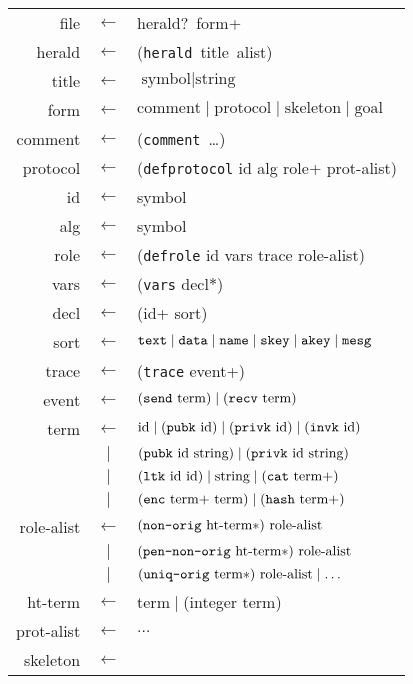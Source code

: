 \begin{table}
\newcommand{\sym}[1]{\textup{\texttt{#1}}}
\begin{center}\scshape
\begin{tabular}{rcl}
file&$\leftarrow$&herald?~form+
\\herald&$\leftarrow$&
(\sym{herald}~title~alist)
\\title&$\leftarrow$&$\mbox{symbol}\mid\mbox{string}$
\\form&$\leftarrow$&
$\mbox{comment}\mid\mbox{protocol}\mid\mbox{skeleton}\mid\mbox{goal}$
\\ comment&$\leftarrow$&
(\sym{comment}~\ldots)
\\ protocol&$\leftarrow$&
(\sym{defprotocol} id alg role+ prot-alist)
\\ id&$\leftarrow$&symbol
\\ alg&$\leftarrow$&symbol
\\ role&$\leftarrow$&
(\sym{defrole} id vars trace role-alist)
\\ vars&$\leftarrow$&
(\sym{vars} decl$\ast$)
\\ decl&$\leftarrow$&
(id+ sort)
\\ sort&$\leftarrow$&
$\sym{text} \mid \sym{data} \mid \sym{name} \mid \sym{skey}
\mid \sym{akey}\mid\sym{mesg}$
\\ trace&$\leftarrow$&(\sym{trace} event+)
\\ event&$\leftarrow$&
$(\sym{send}\mbox{ term})\mid(\sym{recv}\mbox{ term})$
\\ term&$\leftarrow$&
$\mbox{id}\mid(\sym{pubk}\mbox{ id})
\mid(\sym{privk}\mbox{ id})
\mid(\sym{invk}\mbox{ id})$
\\ &$\mid$&$(\sym{pubk}\mbox{ id}\mbox{ string})
\mid(\sym{privk}\mbox{ id}\mbox{ string})$
\\ &$\mid$&$(\sym{ltk}\mbox{ id id})\mid\mbox{string}\mid(\sym{cat}\mbox{ term+})$
\\ &$\mid$&$(\sym{enc}\mbox{ term+ term})\mid(\sym{hash}\mbox{ term+})$
\\ role-alist&$\leftarrow$&$
(\sym{non-orig}\mbox{ ht-term}\ast)\mbox{ role-alist}$
\\ &$\mid$&$(\sym{pen-non-orig}\mbox{ ht-term}\ast)\mbox{ role-alist}$
\\ &$\mid$&$(\sym{uniq-orig}\mbox{ term}\ast)\mbox{ role-alist}\mid\ldots$
\\ ht-term&$\leftarrow$&term${}\mid{}$(integer term)
\\ prot-alist&$\leftarrow$&$\ldots$
\\ skeleton&$\leftarrow$&

\end{tabular}
\end{center}
\end{table}
